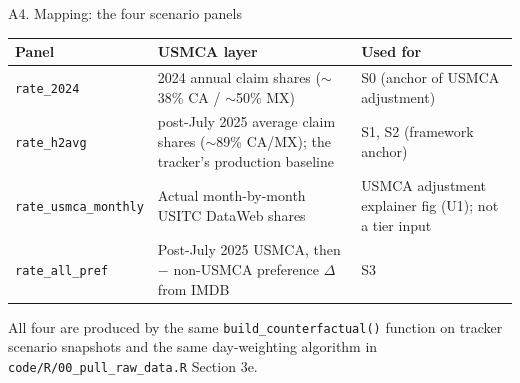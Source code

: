 \documentclass[aspectratio=169,10pt]{beamer}
\begin{document}
\begin{frame}{A4. Mapping: the four scenario panels}

\small

\begin{tabular}{l p{} p{}}
\toprule
Panel & USMCA layer & Used for \\
\midrule
\texttt{rate\_2024}            & 2024 annual claim shares ($\sim$38\% CA / $\sim$50\% MX) & S0 (anchor of USMCA adjustment) \\
\texttt{rate\_h2avg}           & post-July 2025 average claim shares ($\sim$89\% CA/MX); the tracker's production baseline & S1, S2 (framework anchor) \\
\texttt{rate\_usmca\_monthly}  & Actual month-by-month USITC DataWeb shares & USMCA adjustment explainer fig (U1); not a tier input \\
\texttt{rate\_all\_pref}       & Post-July 2025 USMCA, then $-$ non-USMCA preference $\Delta$ from IMDB & S3 \\
\bottomrule
\end{tabular}

\vspace{0.5em}

All four are produced by the same \texttt{build\_counterfactual()} function on tracker scenario snapshots and the same day-weighting algorithm in \texttt{code/R/00\_pull\_raw\_data.R} Section 3e.

\end{frame}
\end{document}
